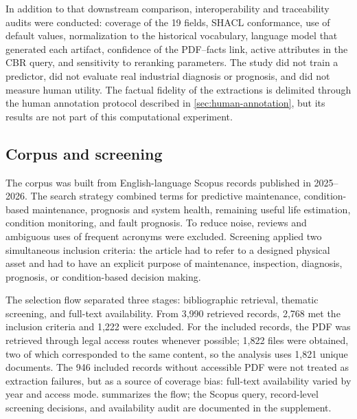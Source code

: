 \documentclass[journal]{IEEEtran}
\begin{document}
In addition to that downstream comparison, interoperability and traceability audits were conducted: coverage of the 19 fields, SHACL conformance, use of default values, normalization to the historical vocabulary, language model that generated each artifact, confidence of the PDF--facts link, active attributes in the CBR query, and sensitivity to reranking parameters. The study did not train a predictor, did not evaluate real industrial diagnosis or prognosis, and did not measure human utility. The factual fidelity of the extractions is delimited through the human annotation protocol described in \cref{sec:human-annotation}, but its results are not part of this computational experiment.

\subsection{Corpus and screening}

The corpus was built from English-language Scopus records published in 2025--2026. The search strategy combined terms for predictive maintenance, condition-based maintenance, prognosis and system health, remaining useful life estimation, condition monitoring, and fault prognosis. To reduce noise, reviews and ambiguous uses of frequent acronyms were excluded. Screening applied two simultaneous inclusion criteria: the article had to refer to a designed physical asset and had to have an explicit purpose of maintenance, inspection, diagnosis, prognosis, or condition-based decision making.

The selection flow separated three stages: bibliographic retrieval, thematic screening, and full-text availability. From 3,990 retrieved records, 2,768 met the inclusion criteria and 1,222 were excluded. For the included records, the PDF was retrieved through legal access routes whenever possible; 1,822 files were obtained, two of which corresponded to the same content, so the analysis uses 1,821 unique documents. The 946 included records without accessible PDF were not treated as extraction failures, but as a source of coverage bias: full-text availability varied by year and access mode.  summarizes the flow; the Scopus query, record-level screening decisions, and availability audit are documented in the supplement.
\end{document}
